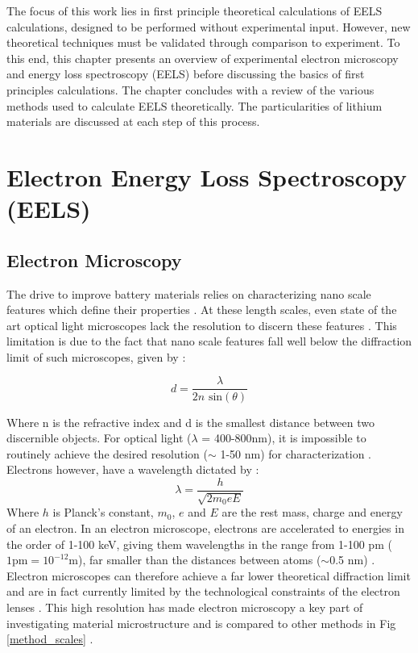 


The focus of this work lies in  first principle theoretical calculations of EELS calculations, designed to be performed without experimental input.  However, new theoretical techniques must be validated through comparison to experiment.  To this end, this chapter presents an overview of experimental electron microscopy and  energy loss spectroscopy (EELS) before discussing the basics of first principles calculations. The chapter concludes with a review of the various methods used to calculate EELS theoretically.  The particularities of lithium materials are discussed at each step of this process.  
 
\section{Electron Energy Loss Spectroscopy (EELS)}

\subsection{Electron Microscopy}
The drive to improve battery materials relies on characterizing  nano scale features which define their properties \cite{goldstein_electron_2003}.  At these length scales, even state of the art optical light microscopes lack the resolution to discern these features \cite{rust_sub-diffraction-limit_2006}.  This limitation is due to the fact that nano scale features fall well below the diffraction limit of such microscopes, given by \cite{hecht}: 

\begin{equation}
	d = \frac{\lambda}{2n\textrm{ sin}(\theta)}
\end{equation}

Where n is the refractive index and d is the smallest distance between two discernible objects. For optical light ($\lambda$ = 400-800nm), it is impossible to routinely achieve the desired resolution ($\sim$ 1-50 nm) for characterization \cite{rust_sub-diffraction-limit_2006}.  Electrons however, have a wavelength dictated by \cite{goldstein_electron_2003}: 
\begin{equation}
 \lambda = \frac{h}{\sqrt{2 m_0 e E}}
\end{equation}
Where $h$ is Planck's constant, $m_0$, $e$ and $E$ are the rest mass, charge and energy of an electron.  In an electron microscope, electrons are accelerated to energies in the order of 1-100 keV, giving them wavelengths in the range from 1-100 pm ($1\mathrm{pm}=10^{-12}$m), far  smaller than the distances between atoms ($\sim$0.5 nm) \cite{morales_laser_1998}.  Electron microscopes can therefore achieve a far lower theoretical diffraction limit  and are in fact currently limited by the technological constraints of the electron  lenses \cite{goldstein_electron_2003}.  This high resolution has made electron microscopy a key part of investigating material microstructure and is compared to other methods  in Fig \ref{method_scales} \cite{inkson_2_2016}. \\


